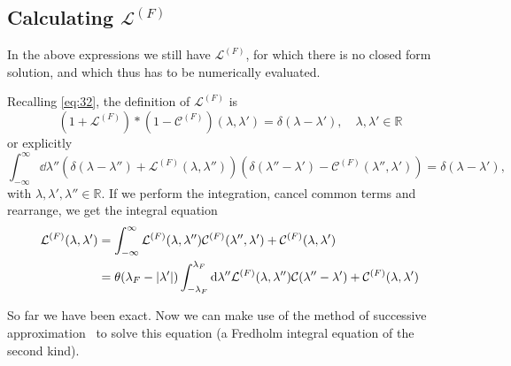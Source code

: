 \documentclass[11pt, a4paper]{report} %
\begin{document}
\subsection{Calculating \(\mathcal{L}^{(F)}\)}

In the above expressions we still have \(\mathcal{L}^{(F)}\), for which there is no closed form solution, and which thus has to be numerically evaluated.

Recalling \cref{eq:32}, the definition of \(\mathcal{L}^{(F)}\) is~\cite{Caux2015}
\begin{equation}
	\left(1 + \mathcal{L}^{(F)}\right) * \left(1 - \mathcal{C}^{(F)}\right)(\lambda,\lambda')=\delta(\lambda-\lambda'), \quad \lambda, \lambda' \in \mathbb{R}
\end{equation}
or explicitly
\begin{equation}
	\int_{-\infty}^{\infty} \dd \lambda'' \left( \delta(\lambda-\lambda'') + \mathcal{L}^{(F)}(\lambda,\lambda'')\right)\left(\delta(\lambda''-\lambda') - \mathcal{C}^{(F)}(\lambda'',\lambda')\right) = \delta(\lambda-\lambda'),
\end{equation}
with  \(\lambda, \lambda', \lambda'' \in \mathbb{R}\).
If we perform the integration, cancel common terms and rearrange, we get the integral equation
\begin{align}
	\mathcal{L}^{(F)}(\lambda,\lambda') &= \int_{-\infty}^{\infty} \mathcal{L}^{(F)}(\lambda,\lambda'') \mathcal{C}^{(F)}(\lambda'',\lambda') + \mathcal{C}^{(F)}(\lambda,\lambda')\\
	&= \theta(\lambda_F - \abs{\lambda'}) \int_{-\lambda_F}^{\lambda_F} \dd \lambda'' \mathcal{L}^{(F)}(\lambda,\lambda'') \mathcal{C}(\lambda''-\lambda') + \mathcal{C}^{(F)}(\lambda,\lambda')
\end{align}

So far we have been exact.
Now we can make use of the method of successive approximation~\cite{Zemyan2012} to solve this equation (a Fredholm integral equation of the second kind).
\end{document}
